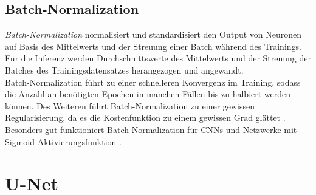\subsection{Batch-Normalization} \label{sec:architekturkomponenten:batchnorm}

\textit{Batch-Normalization} normalisiert und standardisiert den Output von Neuronen auf Basis des Mittelwerts 
und der Streuung einer Batch während des Trainings. Für die Inferenz werden Durchschnittswerte 
des Mittelwerts und der Streuung der Batches des Trainingsdatensatzes herangezogen und angewandt. \\
Batch-Normalization führt zu einer schnelleren Konvergenz im Training, 
sodass die Anzahl an benötigten Epochen in manchen Fällen bis zu halbiert werden können. Des Weiteren führt 
Batch-Normalization zu einer gewissen Regularisierung, da es die Kostenfunktion zu einem gewissen Grad glättet 
\cites{Goodfellow.2016}{Ioffe.11022015}.
Besonders gut funktioniert Batch-Normalization für \acp{CNN} und Netzwerke mit Sigmoid-Aktivierungsfunktion
\cites{Goodfellow.2016}.

\section{U-Net} \label{sec:architekturkomponenten:unet}

